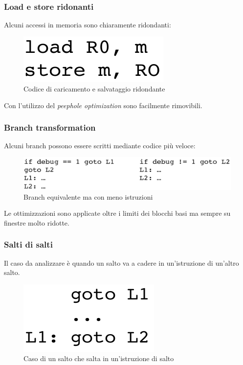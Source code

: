 \subsubsection{Load e store ridonanti}
Alcuni accessi in memoria sono chiaramente ridondanti:
\begin{figure}[H]
  \centering
  \includegraphics[scale=0.4]{res/image/redundant_load_store}
  \caption{Codice di caricamento e salvataggio ridondante}
  \label{img:redundant_load_store}
\end{figure}

Con l'utilizzo del \textit{peephole optimization} sono facilmente
rimovibili.

\subsubsection{Branch transformation}
Alcuni branch possono essere scritti mediante codice pi\`u veloce:
\begin{figure}[H]
  \centering
  \includegraphics[scale=0.4]{res/image/branch_transformation}
  \caption{Branch equivalente ma con meno istruzioni}
  \label{img:branch_transformation}
\end{figure}

Le ottimizzazioni sono applicate oltre i limiti dei blocchi basi ma sempre su
finestre molto ridotte.

\subsubsection{Salti di salti}
Il caso da analizzare \`e quando un salto va a cadere in un'istruzione di
un'altro salto.

\begin{figure}[H]
  \centering
  \includegraphics[scale=0.4]{res/image/jump_jump}
  \caption{Caso di un salto che salta in un'istruzione di salto}
  \label{img:jump_jump}
\end{figure}

